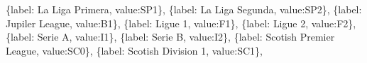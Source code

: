 \documentclass[
  letterpaper,
  DIV=11,
  numbers=noendperiod]{scrartcl}
\newenvironment{Shaded}{\begin{snugshade}}{\end{snugshade}}
\newcommand{\NormalTok}[1]{\textcolor[rgb]{0.00,0.23,0.31}{#1}}
\newcommand{\StringTok}[1]{\textcolor[rgb]{0.13,0.47,0.30}{#1}}
\begin{document}
\begin{Shaded}
\begin{Highlighting}[]
\NormalTok{                \{}\StringTok{\textquotesingle{}label\textquotesingle{}}\NormalTok{: }\StringTok{\textquotesingle{}La Liga Primera\textquotesingle{}}\NormalTok{, }\StringTok{\textquotesingle{}value\textquotesingle{}}\NormalTok{:}\StringTok{\textquotesingle{}SP1\textquotesingle{}}\NormalTok{\},}
\NormalTok{                \{}\StringTok{\textquotesingle{}label\textquotesingle{}}\NormalTok{: }\StringTok{\textquotesingle{}La Liga Segunda\textquotesingle{}}\NormalTok{, }\StringTok{\textquotesingle{}value\textquotesingle{}}\NormalTok{:}\StringTok{\textquotesingle{}SP2\textquotesingle{}}\NormalTok{\},}
\NormalTok{                \{}\StringTok{\textquotesingle{}label\textquotesingle{}}\NormalTok{: }\StringTok{\textquotesingle{}Jupiler League\textquotesingle{}}\NormalTok{, }\StringTok{\textquotesingle{}value\textquotesingle{}}\NormalTok{:}\StringTok{\textquotesingle{}B1\textquotesingle{}}\NormalTok{\},}
\NormalTok{                \{}\StringTok{\textquotesingle{}label\textquotesingle{}}\NormalTok{: }\StringTok{\textquotesingle{}Ligue 1\textquotesingle{}}\NormalTok{, }\StringTok{\textquotesingle{}value\textquotesingle{}}\NormalTok{:}\StringTok{\textquotesingle{}F1\textquotesingle{}}\NormalTok{\},}
\NormalTok{                \{}\StringTok{\textquotesingle{}label\textquotesingle{}}\NormalTok{: }\StringTok{\textquotesingle{}Ligue 2\textquotesingle{}}\NormalTok{, }\StringTok{\textquotesingle{}value\textquotesingle{}}\NormalTok{:}\StringTok{\textquotesingle{}F2\textquotesingle{}}\NormalTok{\},}
\NormalTok{                \{}\StringTok{\textquotesingle{}label\textquotesingle{}}\NormalTok{: }\StringTok{\textquotesingle{}Serie A\textquotesingle{}}\NormalTok{, }\StringTok{\textquotesingle{}value\textquotesingle{}}\NormalTok{:}\StringTok{\textquotesingle{}I1\textquotesingle{}}\NormalTok{\},}
\NormalTok{                \{}\StringTok{\textquotesingle{}label\textquotesingle{}}\NormalTok{: }\StringTok{\textquotesingle{}Serie B\textquotesingle{}}\NormalTok{, }\StringTok{\textquotesingle{}value\textquotesingle{}}\NormalTok{:}\StringTok{\textquotesingle{}I2\textquotesingle{}}\NormalTok{\},}
\NormalTok{                \{}\StringTok{\textquotesingle{}label\textquotesingle{}}\NormalTok{: }\StringTok{\textquotesingle{}Scotish Premier League\textquotesingle{}}\NormalTok{, }\StringTok{\textquotesingle{}value\textquotesingle{}}\NormalTok{:}\StringTok{\textquotesingle{}SC0\textquotesingle{}}\NormalTok{\},}
\NormalTok{                \{}\StringTok{\textquotesingle{}label\textquotesingle{}}\NormalTok{: }\StringTok{\textquotesingle{}Scotish Division 1\textquotesingle{}}\NormalTok{, }\StringTok{\textquotesingle{}value\textquotesingle{}}\NormalTok{:}\StringTok{\textquotesingle{}SC1\textquotesingle{}}\NormalTok{\},}

\end{Highlighting}
\end{Shaded}
\end{document}
